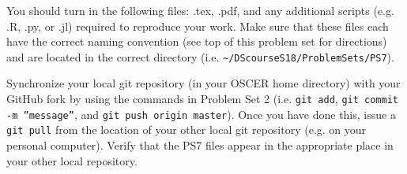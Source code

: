 \documentclass[12pt,english]{exam}
\begin{document}
\begin{questions}
\question You should turn in the following files: .tex, .pdf, and any additional scripts (e.g. .R, .py, or .jl) required to reproduce your work.  Make sure that these files each have the correct naming convention (see top of this problem set for directions) and are located in the correct directory (i.e. \texttt{\textasciitilde/DScourseS18/ProblemSets/PS7}).

\question Synchronize your local git repository (in your OSCER home directory) with your GitHub fork by using the commands in Problem Set 2 (i.e. \texttt{git add}, \texttt{git commit -m ''message''}, and \texttt{git push origin master}). Once you have done this, issue a \texttt{git pull} from the location of your other local git repository (e.g. on your personal computer). Verify that the PS7 files appear in the appropriate place in your other local repository.

\end{questions}
\end{document}
